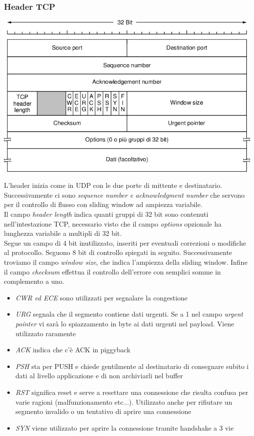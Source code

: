 \documentclass[10pt,a4paper,twoside]{article}
\begin{document}
\subsubsection{Header TCP}
\begin{minipage}{0.4\textwidth}
\includegraphics[width=\textwidth]{images/header_tcp.png}
\end{minipage}
\begin{minipage}{0.6\textwidth}
L'header inizia come in UDP con le due porte di mittente e destinatario. Successivamente ci sono \textit{sequence number e acknowledgment number} che servono per il controllo di flusso con sliding window ad ampiezza variabile.\\
Il campo \textit{header length} indica quanti gruppi di 32 bit sono contenuti nell'intestazione TCP, necessario visto che il campo \textit{options} opzionale ha lunghezza variabile a multipli di 32 bit.\\
Segue un campo di 4 bit inutilizzato, inseriti per eventuali correzioni o modifiche al protocollo. Seguono 8 bit di controllo spiegati in seguito. Successivamente troviamo il campo \textit{window size}, che indica l'ampiezza della sliding window. Infine il campo \textit{checksum} effettua il controllo dell'errore con semplici somme in complemento a uno.
\end{minipage}

\begin{itemize}
\item \textit{CWR ed ECE} sono utilizzati per segnalare la congestione
\item \textit{URG} segnala che il segmento contiene dati urgenti. Se a 1 nel campo \textit{urgent pointer} vi sarà lo spiazzamento in byte ai dati urgenti nel payload. Viene utilizzato raramente
\item \textit{ACK} indica che c'è ACK in piggyback
\item \textit{PSH} sta per PUSH e chiede gentilmente al destinatario di consegnare subito i dati al livello applicazione e di non archiviarli nel buffer
\item \textit{RST} significa reset e serve a resettare una connessione che risulta confusa per varie ragioni (malfunzionamento etc...). Utilizzato anche per rifiutare un segmento invalido o un tentativo di aprire una connessione
\item \textit{SYN} viene utilizzato per aprire la connessione tramite handshake a 3 vie
\end{itemize}
\end{document}
